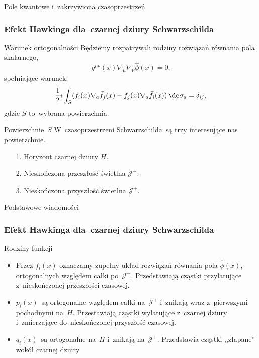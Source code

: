 \documentclass{beamer}  %
\begin{document}
\begin{frame}{Pole kwantowe i~zakrzywiona czasoprzestrzeń}
  \frametitle{Efekt Hawkinga dla~czarnej dziury Schwarzschilda}

  \begin{block}{Warunek ortogonalności}
    Będziemy rozpatrywali rodziny rozwiązań równania pola skalarnego,
    \begin{equation}
      \label{eq:HawkingPromieniowanie-15}
      g^{ \mu \nu }( x ) \nabla_{ \mu } \nabla_{ \nu }
      \widehat{ \phi }( x ) = 0.
    \end{equation}
    spełniające warunek:
    \begin{equation}
      \label{eq:HawkingPromieniowanie-16}
      \frac{ 1 }{ 2 } i\int_{ S }( f_{ i }( x )
      \nabla_{ a }\bar{ f }_{ j }( x ) - f_{ j }( x )
      \nabla_{ a } \bar{ f }_{ i }( x ) )\, \de\sigma_{ a }
      = \delta_{ i j },
    \end{equation}
    gdzie $S$ to~wybrana powierzchnia.
  \end{block}

  \begin{block}{Powierzchnie~$S$}
    W~czasoprzestrzeni Schwarzschilda~są trzy interesujące nas
    powierzchnie.
    \begin{itemize}
    \item[1.] Horyzont czarnej dziury $H$.
    \item[2.] Nieskończona przeszłość świetlna $\mathcal{J}^{ - }$.
    \item[3.] Nieskończona przyszłość świetlna $\mathcal{J}^{ + }$.
    \end{itemize}
  \end{block}

\end{frame}




\begin{frame}{Podstawowe wiadomości}
  \frametitle{Efekt Hawkinga dla~czarnej dziury Schwarzschilda}

  \begin{block}{Rodziny funkcji}
    \begin{itemize}
    \item Przez $f_{ i }( x )$ oznaczamy zupełny układ rozwiązań
      równania pola $\widehat{ \phi }( x )$, ortogonalnych względem
      całki po~$\mathcal{J}^{ - }$. Przedstawiają cząstki przylatujące
      z~nieskończonej przeszłości czasowej.
    \item $p_{ i }( x )$~są ortogonalne względem całki
      na~$\mathcal{J}^{ + }$ i~znikają wraz z~pierwszymi pochodnymi
      na~$H$. Przestawiają cząstki wylatujące z~czarnej dziury
      i~zmierzające do~nieskończonej przyszłość czasowej.
    \item $q_{ i }( x )$~są ortogonalne na~$H$ i~znikają
      na~$\mathcal{J}^{ + }$. Przedstawia cząstki ,,złapane'' wokół
      czarnej dziury
    \end{itemize}
  \end{block}

\end{frame}
\end{document}
